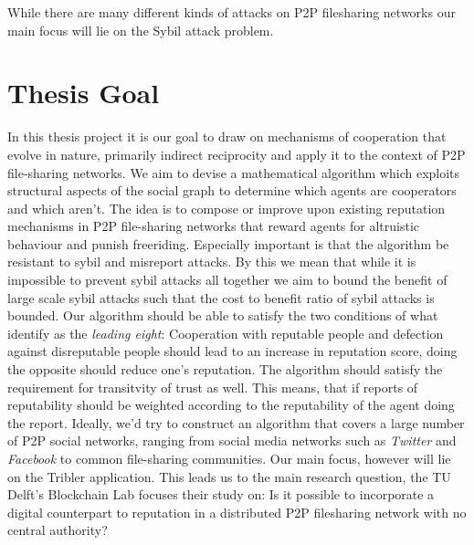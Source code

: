 \documentclass[11pt,a4paper]{report}
\theoremstyle{definition}
\theoremstyle{theorem}
\theoremstyle{proposition}
\theoremstyle{corollary}
\theoremstyle{lemma}
\theoremstyle{example}
\theoremstyle{remark}
\begin{document}
\noindent{}While there are many different kinds of attacks on P2P filesharing networks our main focus will lie on the Sybil attack problem.\vspace{1em}\\

\section{Thesis Goal}
\label{sec:Thesis Goal}
In this thesis project it is our goal to draw on mechanisms of cooperation that evolve in nature, primarily indirect reciprocity and apply it to the context of P2P file-sharing networks. We aim to devise a mathematical algorithm which exploits structural aspects of the social graph to determine which agents are cooperators and which aren't. The idea is to compose or improve upon existing reputation mechanisms in P2P file-sharing networks that reward agents for altruistic behaviour and punish freeriding. Especially important is that the algorithm be resistant to sybil and misreport attacks. By this we mean that while it is impossible to prevent sybil attacks all together we aim to bound the benefit of large scale sybil attacks such that the cost to benefit ratio of sybil attacks is bounded. Our algorithm should be able to satisfy the two conditions of what \cite{How Should We Define Goodness} identify as the {\it leading eight}: Cooperation with reputable people and defection against disreputable people should lead to an increase in reputation score, doing the opposite should reduce one's reputation. The algorithm should satisfy the requirement for transitvity of trust as well. This means, that if reports of reputability should be weighted according to the reputability of the agent doing the report. Ideally, we'd try to construct an algorithm that covers a large number of P2P social networks, ranging from social media networks such as {\it Twitter} and {\it Facebook} to common file-sharing communities. Our main focus, however will lie on the Tribler application. This leads us to the main research question, the TU Delft's Blockchain Lab focuses their study on: Is it possible to incorporate a digital counterpart to reputation in a distributed P2P filesharing network with no central authority? \vspace{1em}\\
\end{document}
